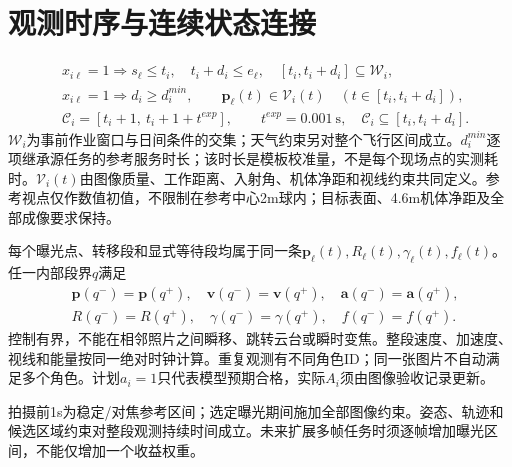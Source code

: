 \section{观测时序与连续状态连接}
\begin{align}
 &x_{i\ell}=1\Rightarrow s_\ell\le t_i,\quad t_i+d_i\le e_\ell,\quad
 [t_i,t_i+d_i]\subseteq\mathcal W_i,\label{eng:eq:window}\\
 &x_{i\ell}=1\Rightarrow d_i\ge d_i^{min},\qquad
 \mathbf p_\ell(t)\in\mathcal V_i(t)
       \quad(t\in[t_i,t_i+d_i]),\label{eng:eq:viewregion}\\
 &\mathcal C_i=[t_i+1,\ t_i+1+t^{exp}],\qquad t^{exp}=0.001\ \mathrm s,
 \quad \mathcal C_i\subseteq[t_i,t_i+d_i].\label{eng:eq:exposure}
\end{align}
\noindent $\mathcal W_i$为事前作业窗口与日间条件的交集；天气约束另对整个飞行区间成立。$d_i^{min}$逐项继承源任务的参考服务时长；该时长是模板校准量，不是每个现场点的实测耗时。$\mathcal V_i(t)$由图像质量、工作距离、入射角、机体净距和视线约束共同定义。参考视点仅作数值初值，不限制在参考中心2m球内；目标表面、4.6m机体净距及全部成像要求保持。

\noindent 每个曝光点、转移段和显式等待段均属于同一条$\mathbf p_\ell(t),R_\ell(t),\gamma_\ell(t),f_\ell(t)$。任一内部段界$q$满足
\begin{align}
 &\mathbf p(q^-)=\mathbf p(q^+),\quad
 \mathbf v(q^-)=\mathbf v(q^+),\quad\mathbf a(q^-)=\mathbf a(q^+),\\
 &R(q^-)=R(q^+),\quad \gamma(q^-)=\gamma(q^+),\quad f(q^-)=f(q^+).
 \label{eng:eq:statejoins}
\end{align}
\noindent 控制有界，不能在相邻照片之间瞬移、跳转云台或瞬时变焦。整段速度、加速度、视线和能量按同一绝对时钟计算。重复观测有不同角色ID；同一张图片不自动满足多个角色。计划$a_i=1$只代表模型预期合格，实际$A_i$须由图像验收记录更新。

\noindent 拍摄前1s为稳定/对焦参考区间；选定曝光期间施加全部图像约束。姿态、轨迹和候选区域约束对整段观测持续时间成立。未来扩展多帧任务时须逐帧增加曝光区间，不能仅增加一个收益权重。
\clearpage

